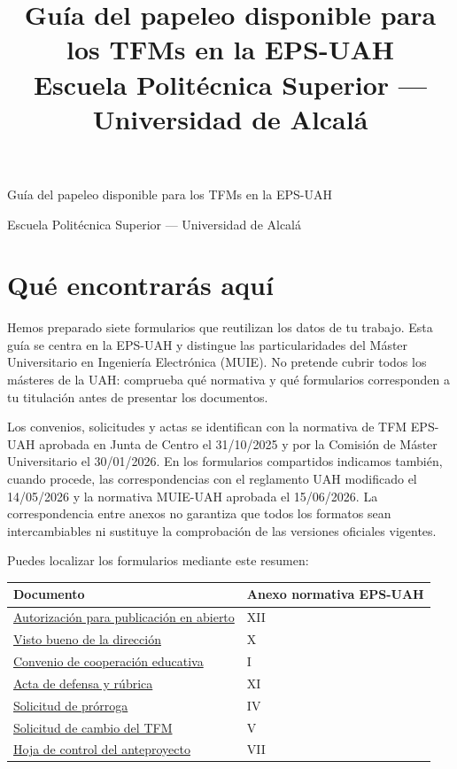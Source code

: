 \documentclass[10pt,a4paper]{article}
\title{Guía del papeleo disponible para los TFMs en la EPS-UAH\\\large Escuela Politécnica Superior --- Universidad de Alcalá}
\author{}
\date{}
\begin{document}
\begin{center}
{\LARGE Guía del papeleo disponible para los TFMs en la EPS-UAH\par}
\medskip
{\large Escuela Politécnica Superior --- Universidad de Alcalá\par}
\end{center}

{\small
\setlength{\parskip}{0pt}
\tableofcontents
}
\medskip

\section{Qué encontrarás aquí}

Hemos preparado siete formularios que reutilizan los datos de tu trabajo. Esta guía se centra en la EPS-UAH y distingue las particularidades del Máster Universitario en Ingeniería Electrónica (MUIE). No pretende cubrir todos los másteres de la UAH: comprueba qué normativa y qué formularios corresponden a tu titulación antes de presentar los documentos.

Los convenios, solicitudes y actas se identifican con la normativa de TFM EPS-UAH aprobada en Junta de Centro el 31/10/2025 y por la Comisión de Máster Universitario el 30/01/2026. En los formularios compartidos indicamos también, cuando procede, las correspondencias con el reglamento UAH modificado el 14/05/2026 y la normativa MUIE-UAH aprobada el 15/06/2026. La correspondencia entre anexos no garantiza que todos los formatos sean intercambiables ni sustituye la comprobación de las versiones oficiales vigentes.

Puedes localizar los formularios mediante este resumen:

\medskip
\begin{tabularx}{\textwidth}{@{}Xl@{}}
\toprule
Documento & Anexo normativa EPS-UAH \\
\midrule
\hyperref[form:publicacion]{Autorización para publicación en abierto} & XII \\
\hyperref[form:visto-bueno]{Visto bueno de la dirección} & X \\
\hyperref[form:convenio]{Convenio de cooperación educativa} & I \\
\hyperref[form:acta]{Acta de defensa y rúbrica} & XI \\
\hyperref[form:prorroga]{Solicitud de prórroga} & IV \\
\hyperref[form:cambio]{Solicitud de cambio del TFM} & V \\
\hyperref[form:control-anteproyecto]{Hoja de control del anteproyecto} & VII \\
\bottomrule
\end{tabularx}
\end{document}

